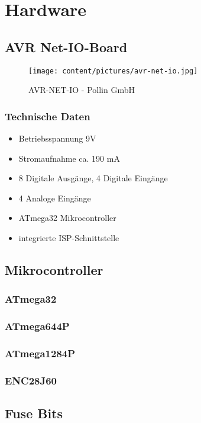 \chapter{Hardware}
\section{AVR Net-IO-Board}
\begin{figure}[h]
\centering
\texttt{[image: content/pictures/avr-net-io.jpg]}
\caption{AVR-NET-IO - Pollin GmbH}
\label{fig:B3}
\end{figure}

\subsection{Technische Daten}
\begin{itemize}
  \item Betriebsspannung 9V
  \item Stromaufnahme ca. 190 mA
  \item 8 Digitale Ausgänge, 4 Digitale Eingänge
  \item 4 Analoge Eingänge
  \item ATmega32 Mikrocontroller
  \item integrierte ISP-Schnittstelle
\end{itemize}

\section{Mikrocontroller}
\subsection{ATmega32}

\subsection{ATmega644P}

\subsection{ATmega1284P}

\subsection{ENC28J60}

\section{Fuse Bits}
\label{chap:Fuse}
